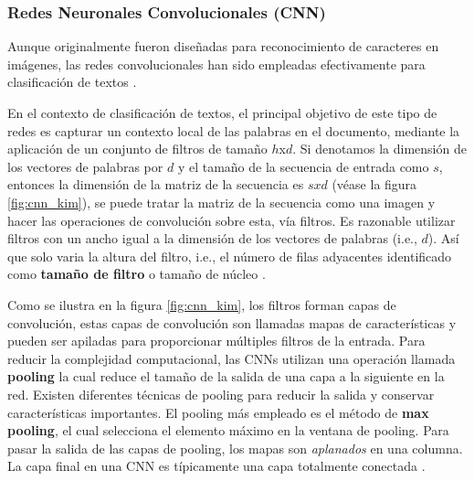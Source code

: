\subsubsection{Redes Neuronales Convolucionales (CNN)} 

Aunque originalmente fueron diseñadas para reconocimiento de caracteres en imágenes, las redes convolucionales han sido empleadas efectivamente para clasificación de textos \citep{kim2014convolutional, zhang2015character, zhang2015sensitivity, conneau2016very}. 

En el contexto de clasificación de textos, el principal objetivo de este tipo de redes es capturar un contexto local de las palabras en el documento, mediante la aplicación de un conjunto de filtros de tamaño $h$x$d$. Si denotamos la dimensión de los vectores de palabras por $d$ y el tamaño de la secuencia de entrada como $s$, entonces la dimensión de la matriz de la secuencia es $s x d$ (véase la figura \ref{fig:cnn_kim}), se puede tratar la matriz de la secuencia como una imagen y hacer las operaciones de convolución sobre esta, vía filtros. Es razonable utilizar filtros con un ancho igual a la dimensión de los vectores de palabras (i.e., $d$). Así que solo varia la altura del filtro, i.e., el número de filas adyacentes identificado como \textbf{tamaño de filtro} o tamaño de núcleo \cite{zhang2015sensitivity}. 

Como se ilustra en la figura \ref{fig:cnn_kim}, los filtros forman capas de convolución, estas capas de convolución son llamadas mapas de características y pueden ser apiladas para proporcionar múltiples filtros de la entrada. Para reducir la complejidad computacional, las CNNs utilizan una operación llamada \textbf{pooling} la cual reduce el tamaño de la salida de una capa a la siguiente en la red. Existen diferentes técnicas de pooling para reducir la salida y conservar características importantes. El pooling más empleado es el método de \textbf{max pooling}, el cual selecciona el elemento máximo en la ventana de pooling. Para pasar la salida de las capas de pooling, los mapas son \textit{aplanados} en una columna. La capa final en una CNN es típicamente una capa totalmente conectada \cite{kowsari2019text}.

